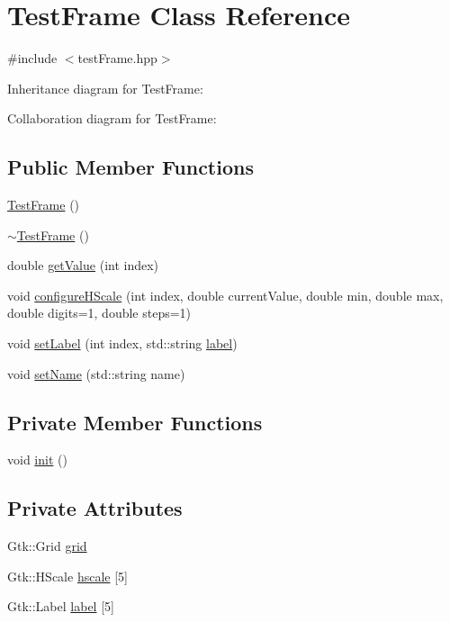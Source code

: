 \hypertarget{class_test_frame}{}\section{Test\+Frame Class Reference}
\label{class_test_frame}


{\ttfamily \#include $<$test\+Frame.\+hpp$>$}



Inheritance diagram for Test\+Frame\+:


Collaboration diagram for Test\+Frame\+:
\subsection*{Public Member Functions}
\begin{DoxyCompactItemize}
\item 
\hyperlink{class_test_frame_adaa27a5475a2455990002fce216ccb39}{Test\+Frame} ()
\item 
\hyperlink{class_test_frame_a1b949a105850e3cc7886093d18c11758}{$\sim$\+Test\+Frame} ()
\item 
double \hyperlink{class_test_frame_aeb75046b3b4be4c4dbc43d233e967a08}{get\+Value} (int index)
\item 
void \hyperlink{class_test_frame_a11a2d806abe566abbc431bff4b43ab79}{configure\+H\+Scale} (int index, double current\+Value, double min, double max, double digits=1, double steps=1)
\item 
void \hyperlink{class_test_frame_a125817ea431fb013eaf2b9f11714bd9b}{set\+Label} (int index, std\+::string \hyperlink{class_test_frame_a0fb8c663f048dc69899409a61bd22025}{label})
\item 
void \hyperlink{class_test_frame_a1b1a37526e0ce6c7e48babba09fdbdd5}{set\+Name} (std\+::string name)
\end{DoxyCompactItemize}
\subsection*{Private Member Functions}
\begin{DoxyCompactItemize}
\item 
void \hyperlink{class_test_frame_a54de7710b7685cff78b034f0f631c31d}{init} ()
\end{DoxyCompactItemize}
\subsection*{Private Attributes}
\begin{DoxyCompactItemize}
\item 
Gtk\+::\+Grid \hyperlink{class_test_frame_a8db1fcde1fac654bd8e6bd947da2dd10}{grid}
\item 
Gtk\+::\+H\+Scale \hyperlink{class_test_frame_ac85dadacc49bc00afc3df6c60635c1e3}{hscale} \mbox{[}5\mbox{]}
\item 
Gtk\+::\+Label \hyperlink{class_test_frame_a0fb8c663f048dc69899409a61bd22025}{label} \mbox{[}5\mbox{]}
\end{DoxyCompactItemize}


